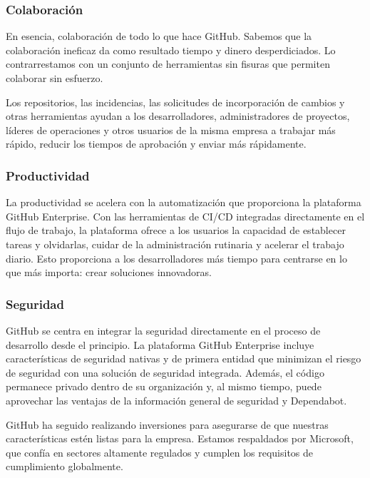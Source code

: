 \subsubsection*{Colaboración}

En esencia, colaboración de todo lo que hace GitHub. Sabemos que la colaboración ineficaz da como resultado tiempo y dinero desperdiciados. Lo contrarrestamos con un conjunto de herramientas sin fisuras que permiten colaborar sin esfuerzo.

Los repositorios, las incidencias, las solicitudes de incorporación de cambios y otras herramientas ayudan a los desarrolladores, administradores de proyectos, líderes de operaciones y otros usuarios de la misma empresa a trabajar más rápido, reducir los tiempos de aprobación y enviar más rápidamente.

\subsubsection*{Productividad}

La productividad se acelera con la automatización que proporciona la plataforma GitHub Enterprise. Con las herramientas de CI/CD integradas directamente en el flujo de trabajo, la plataforma ofrece a los usuarios la capacidad de establecer tareas y olvidarlas, cuidar de la administración rutinaria y acelerar el trabajo diario. Esto proporciona a los desarrolladores más tiempo para centrarse en lo que más importa: crear soluciones innovadoras.



\subsubsection*{Seguridad}

GitHub se centra en integrar la seguridad directamente en el proceso de desarrollo desde el principio. La plataforma GitHub Enterprise incluye características de seguridad nativas y de primera entidad que minimizan el riesgo de seguridad con una solución de seguridad integrada. Además, el código permanece privado dentro de su organización y, al mismo tiempo, puede aprovechar las ventajas de la información general de seguridad y Dependabot.

GitHub ha seguido realizando inversiones para asegurarse de que nuestras características estén listas para la empresa. Estamos respaldados por Microsoft, que confía en sectores altamente regulados y cumplen los requisitos de cumplimiento globalmente.

